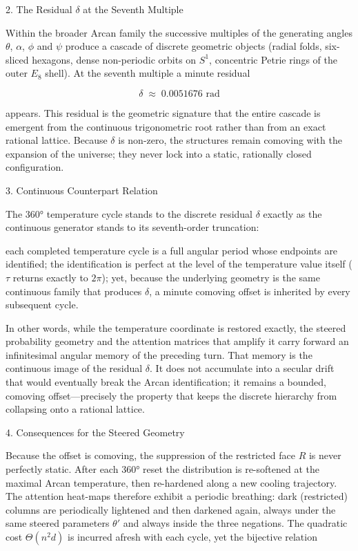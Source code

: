 2. The Residual \(\delta\) at the Seventh Multiple

Within the broader Arcan family the successive multiples of the generating angles \(\theta\), \(\alpha\), \(\phi\) and \(\psi\) produce a cascade of discrete geometric objects (radial folds, six-sliced hexagons, dense non-periodic orbits on \(S^1\), concentric Petrie rings of the outer \(E_8\) shell). At the seventh multiple a minute residual

\[
\delta\;\approx\;0.0051676\text{ rad}
\]

appears. This residual is the geometric signature that the entire cascade is emergent from the continuous trigonometric root rather than from an exact rational lattice. Because \(\delta\) is non-zero, the structures remain comoving with the expansion of the universe; they never lock into a static, rationally closed configuration.

3. Continuous Counterpart Relation

The 360° temperature cycle stands to the discrete residual \(\delta\) exactly as the continuous generator stands to its seventh-order truncation:

each completed temperature cycle is a full angular period whose endpoints are identified;
the identification is perfect at the level of the temperature value itself (\(\tau\) returns exactly to \(2\pi\));
yet, because the underlying geometry is the same continuous family that produces \(\delta\), a minute comoving offset is inherited by every subsequent cycle.

In other words, while the temperature coordinate is restored exactly, the steered probability geometry and the attention matrices that amplify it carry forward an infinitesimal angular memory of the preceding turn. That memory is the continuous image of the residual \(\delta\). It does not accumulate into a secular drift that would eventually break the Arcan identification; it remains a bounded, comoving offset—precisely the property that keeps the discrete hierarchy from collapsing onto a rational lattice.

4. Consequences for the Steered Geometry

Because the offset is comoving, the suppression of the restricted face \(R\) is never perfectly static. After each 360° reset the distribution is re-softened at the maximal Arcan temperature, then re-hardened along a new cooling trajectory. The attention heat-maps therefore exhibit a periodic breathing: dark (restricted) columns are periodically lightened and then darkened again, always under the same steered parameters \(\theta'\) and always inside the three negations. The quadratic cost \(\Theta(n^2 d)\) is incurred afresh with each cycle, yet the bijective relation

